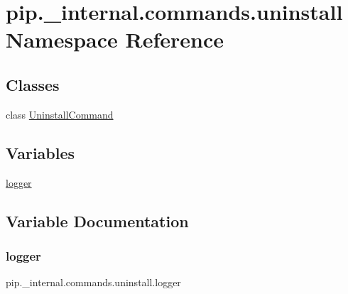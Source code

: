 \hypertarget{namespacepip_1_1__internal_1_1commands_1_1uninstall}{}\section{pip.\+\_\+internal.\+commands.\+uninstall Namespace Reference}
\label{namespacepip_1_1__internal_1_1commands_1_1uninstall}
\subsection*{Classes}
\begin{DoxyCompactItemize}
\item 
class \hyperlink{classpip_1_1__internal_1_1commands_1_1uninstall_1_1UninstallCommand}{Uninstall\+Command}
\end{DoxyCompactItemize}
\subsection*{Variables}
\begin{DoxyCompactItemize}
\item 
\hyperlink{namespacepip_1_1__internal_1_1commands_1_1uninstall_af9ebbfd0de0f66d63bcee62f9ffeea29}{logger}
\end{DoxyCompactItemize}


\subsection{Variable Documentation}
\mbox{\label{namespacepip_1_1__internal_1_1commands_1_1uninstall_af9ebbfd0de0f66d63bcee62f9ffeea29}} 
\subsubsection{\texorpdfstring{logger}{logger}}
{\footnotesize\ttfamily pip.\+\_\+internal.\+commands.\+uninstall.\+logger}

